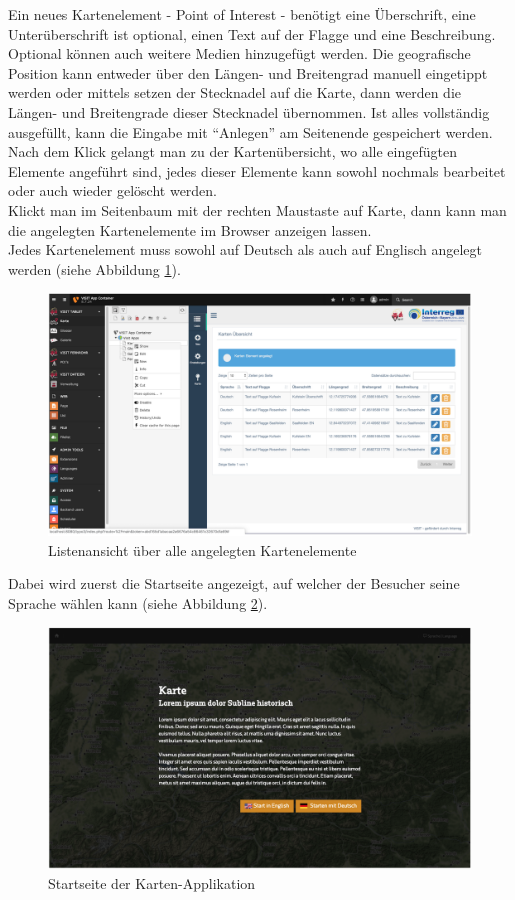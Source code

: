 Ein neues Kartenelement - Point of Interest - benötigt eine Überschrift, eine Unterüberschrift ist optional, einen Text auf der Flagge und eine Beschreibung. Optional können auch weitere Medien hinzugefügt werden. Die geografische Position kann entweder über den Längen- und Breitengrad manuell eingetippt werden oder mittels setzen der Stecknadel auf die Karte, dann werden die Längen- und Breitengrade dieser Stecknadel übernommen. Ist alles vollständig ausgefüllt, kann die Eingabe mit “Anlegen” am Seitenende gespeichert werden. Nach dem Klick gelangt man zu der Kartenübersicht, wo alle eingefügten Elemente angeführt sind, jedes dieser Elemente kann sowohl nochmals bearbeitet oder auch wieder gelöscht werden.\\
Klickt man im Seitenbaum mit der rechten Maustaste auf Karte, dann kann man die angelegten Kartenelemente im Browser anzeigen lassen.\\
Jedes Kartenelement muss sowohl auf Deutsch als auch auf Englisch angelegt werden (siehe Abbildung \ref{img:listenuebersicht_kartenelemente}).

\begin{figure}[ht!]
\centering
\includegraphics[width=12cm]{Figures/paula/listenuebersicht_kartenelemente.png}
\caption{Listenansicht über alle angelegten Kartenelemente}
\label{img:listenuebersicht_kartenelemente}
\end{figure}

Dabei wird zuerst die Startseite angezeigt, auf welcher der Besucher seine Sprache wählen kann (siehe Abbildung \ref{img:startseite_kartenapp}).

\begin{figure}[ht!]
\centering
\includegraphics[width=12cm]{Figures/paula/startseite_kartenapp.png}
\caption{Startseite der Karten-Applikation}
\label{img:startseite_kartenapp}
\end{figure}

